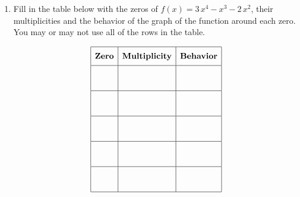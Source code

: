 \documentclass[11pt]{article}
\begin{document}
\begin{enumerate}
{{}
}

\newpage

% 

\item %
\providecommand{\stxKnowl}{}\renewcommand{\stxKnowl}[1]{#1}
\providecommand{\stxOuttro}{}\renewcommand{\stxOuttro}[1]{#1}
\providecommand{\stxTitle}{}\renewcommand{\stxTitle}[1]{#1}
\renewcommand{\stxOuttro}[1]{}
\stxKnowl{
Fill in the table below with the zeros of \(f(x) = 3 \, x^{4} - x^{3} - 2 \, x^{2}\), their multiplicities and the behavior of the graph of the function around each zero. You may or may not use all of the rows in the table.

 \[\begin{array}{|c|c|c|} \hline \rule[-0.8em]{0pt}{2.2em} \textbf{Zero} & \textbf{Multiplicity} & \textbf{Behavior} \\ \hline \rule[-1.2em]{0pt}{3em} & & \\ \hline \rule[-1.2em]{0pt}{3em} & & \\ \hline \rule[-1.2em]{0pt}{3em} & & \\ \hline \rule[-1.2em]{0pt}{3em} & & \\ \hline \rule[-1.2em]{0pt}{3em} & & \\ \hline \end{array}\] 

\stxOuttro{
Solution

\[\begin{aligned} f(x) &= 3 \, x^{4} - x^{3} - 2 \, x^{2} \\ &= x^2(3 \, x^{2} - x - 2) \\ &= x^2(3x + 2)(x - 1) \end{aligned}\]

 \[\begin{array}{|c|c|c|} \hline \rule[-0.8em]{0pt}{2.2em} \textbf{Zero} & \textbf{Multiplicity} & \textbf{Behavior} \\ \hline \rule[-1.2em]{0pt}{3em} -\frac{2}{3} & 1 & \text{cross} \\ \hline \rule[-1.2em]{0pt}{3em} 0 & 2 & \text{bounce} \\ \hline \rule[-1.2em]{0pt}{3em} 1 & 1 & \text{cross} \\ \hline \rule[-1.2em]{0pt}{3em} & & \\ \hline \rule[-1.2em]{0pt}{3em} & & \\ \hline \end{array}\] 

}}
\end{enumerate}
\end{document}
